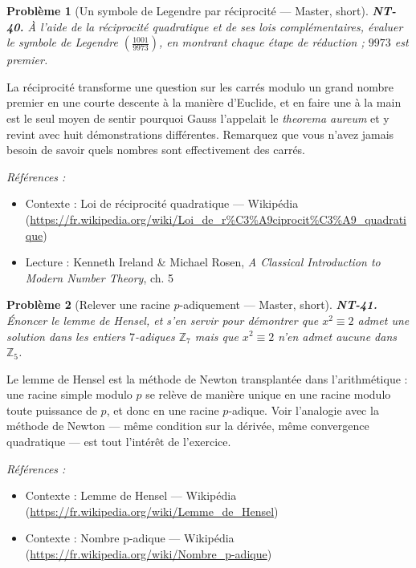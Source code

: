 \documentclass[11pt]{article}
\newtheorem{problem}{Problème}
\newenvironment{refs}{\par\small\noindent\emph{Références :}\begin{itemize}\setlength\itemsep{0pt}}{\end{itemize}\normalsize}
\begin{document}
\bigskip

\begin{problem}[{Un symbole de Legendre par réciprocité --- Master, short}]
\textbf{NT-40.} À l'aide de la réciprocité quadratique et de ses lois complémentaires, évaluer le symbole de Legendre $ \left( \frac{1001}{9973} \right) $, en montrant chaque étape de réduction ; $ 9973 $ est premier.
\end{problem}

\noindent La réciprocité transforme une question sur les carrés modulo un grand nombre premier en une courte descente à la manière d'Euclide, et en faire une à la main est le seul moyen de sentir pourquoi Gauss l'appelait le \textit{theorema aureum} et y revint avec huit démonstrations différentes. Remarquez que vous n'avez jamais besoin de savoir quels nombres sont effectivement des carrés.

\begin{refs}
\item Contexte : Loi de réciprocité quadratique --- Wikipédia (\url{https://fr.wikipedia.org/wiki/Loi_de_r%C3%A9ciprocit%C3%A9_quadratique})
\item Lecture : Kenneth Ireland \& Michael Rosen, \textit{A Classical Introduction to Modern Number Theory}, ch. 5
\end{refs}

\bigskip

\begin{problem}[{Relever une racine $ p $-adiquement --- Master, short}]
\textbf{NT-41.} Énoncer le lemme de Hensel, et s'en servir pour démontrer que $ x^2 \equiv 2 $ admet une solution dans les entiers $ 7 $-adiques $ \mathbb{Z}_7 $ mais que $ x^2 \equiv 2 $ n'en admet aucune dans $ \mathbb{Z}_5 $.
\end{problem}

\noindent Le lemme de Hensel est la méthode de Newton transplantée dans l'arithmétique : une racine simple modulo $ p $ se relève de manière unique en une racine modulo toute puissance de $ p $, et donc en une racine $ p $-adique. Voir l'analogie avec la méthode de Newton --- même condition sur la dérivée, même convergence quadratique --- est tout l'intérêt de l'exercice.

\begin{refs}
\item Contexte : Lemme de Hensel --- Wikipédia (\url{https://fr.wikipedia.org/wiki/Lemme_de_Hensel})
\item Contexte : Nombre p-adique --- Wikipédia (\url{https://fr.wikipedia.org/wiki/Nombre_p-adique})
\end{refs}
\end{document}
